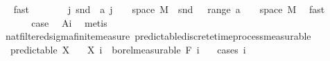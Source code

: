 \begin{isabellebody}
\ {\isacharasterisk}{\kern0pt}\ \isamarkupfalse%
\ fast\isanewline
\ \ \ \ \isamarkupfalse%
\ \isamarkupfalse%
\ {\isachardoublequoteopen}{\isacharparenleft}{\kern0pt}{\isasymUnion}j{\isachardot}{\kern0pt}\ snd\ {\isacharbackquote}{\kern0pt}\ {\isacharparenleft}{\kern0pt}a\ j\ {\isasyminter}\ {\isacharparenleft}{\kern0pt}{\isacharbraceleft}{\kern0pt}{}{\isacharbraceright}{\kern0pt}\ {\isasymtimes}\ space\ M{\isacharparenright}{\kern0pt}{\isacharparenright}{\kern0pt}{\isacharparenright}{\kern0pt}\ {\isacharequal}{\kern0pt}\ snd\ {\isacharbackquote}{\kern0pt}\ {\isacharparenleft}{\kern0pt}{\isasymUnion}\ {\isacharparenleft}{\kern0pt}range\ a{\isacharparenright}{\kern0pt}\ {\isasyminter}\ {\isacharparenleft}{\kern0pt}{\isacharbraceleft}{\kern0pt}{}{\isacharbraceright}{\kern0pt}\ {\isasymtimes}\ space\ M{\isacharparenright}{\kern0pt}{\isacharparenright}{\kern0pt}{\isachardoublequoteclose}\ \isamarkupfalse%
\ fast\isanewline
\ \ \ \ \isamarkupfalse%
\ \isamarkupfalse%
\ {\isacharquery}{\kern0pt}case\ \isamarkupfalse%
\ A{\isacharunderscore}{\kern0pt}i\ \isamarkupfalse%
\ metis\isanewline
\ \ \isacommand{{\isacharbraceright}{\kern0pt}}\isamarkupfalse%
\isanewline
{}\isamarkupfalse%
%
\endisatagproof
{\isafoldproof}%
%
\isadelimproof
\isanewline
%
\endisadelimproof
\isanewline
{}\isamarkupfalse%
\ {\isacharparenleft}{\kern0pt}\ nat{\isacharunderscore}{\kern0pt}filtered{\isacharunderscore}{\kern0pt}sigma{\isacharunderscore}{\kern0pt}finite{\isacharunderscore}{\kern0pt}measure{\isacharparenright}{\kern0pt}\ predictable{\isacharunderscore}{\kern0pt}discrete{\isacharunderscore}{\kern0pt}time{\isacharunderscore}{\kern0pt}process{\isacharunderscore}{\kern0pt}measurable{\isacharcolon}{\kern0pt}\isanewline
\ \ \ {\isachardoublequoteopen}predictable\ X{\isachardoublequoteclose}\isanewline
\ \ \ {\isachardoublequoteopen}X\ i\ {\isasymin}\ borel{\isacharunderscore}{\kern0pt}measurable\ {\isacharparenleft}{\kern0pt}F\ {\isacharparenleft}{\kern0pt}i\ {\isacharminus}{\kern0pt}\ {}{\isacharparenright}{\kern0pt}{\isacharparenright}{\kern0pt}{\isachardoublequoteclose}\isanewline
%
\isadelimproof
%
\endisadelimproof
%
\isatagproof
{}\isamarkupfalse%
\ {\isacharparenleft}{\kern0pt}cases\ i{\isacharparenright}{\kern0pt}\isanewline
\ \ \isamarkupfalse%
\ {}\isanewline
\ \ \isacommand{{\isacharbraceleft}{\kern0pt}}\isamarkupfalse%

\end{isabellebody}
